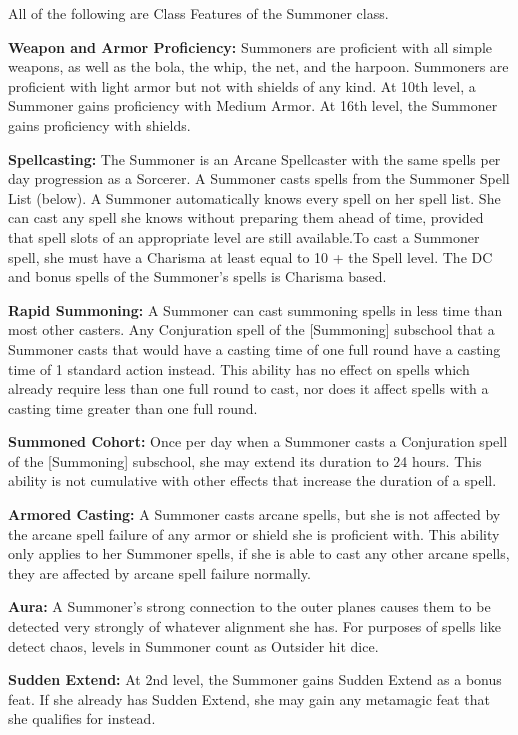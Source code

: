 \documentclass[10pt]{article}
\newcommand{\ability}[2]{\smallskip \noindent \textbf{#1} #2}
\begin{document}
\noindent All of the following are Class Features of the Summoner class.

\ability{Weapon and Armor Proficiency:}{Summoners are proficient with all simple weapons, as well as the bola, the whip, the net, and the harpoon. Summoners are proficient with light armor but not with shields of any kind. At 10th level, a Summoner gains proficiency with Medium Armor. At 16th level, the Summoner gains proficiency with shields.}

\ability{Spellcasting:}{The Summoner is an Arcane Spellcaster with the same spells per day progression as a Sorcerer. A Summoner casts spells from the Summoner Spell List (below). A Summoner automatically knows every spell on her spell list. She can cast any spell she knows without preparing them ahead of time, provided that spell slots of an appropriate level are still available.To cast a Summoner spell, she must have a Charisma at least equal to 10 + the Spell level. The DC and bonus spells of the Summoner's spells is Charisma based.}

\ability{Rapid Summoning:}{A Summoner can cast summoning spells in less time than most other casters. Any Conjuration spell of the [Summoning] subschool that a Summoner casts that would have a casting time of one full round have a casting time of 1 standard action instead. This ability has no effect on spells which already require less than one full round to cast, nor does it affect spells with a casting time greater than one full round.}

\ability{Summoned Cohort:}{Once per day when a Summoner casts a Conjuration spell of the [Summoning] subschool, she may extend its duration to 24 hours. This ability is not cumulative with other effects that increase the duration of a spell.}

\ability{Armored Casting:}{A Summoner casts arcane spells, but she is not affected by the arcane spell failure of any armor or shield she is proficient with. This ability only applies to her Summoner spells, if she is able to cast any other arcane spells, they are affected by arcane spell failure normally.}

\ability{Aura:}{A Summoner's strong connection to the outer planes causes them to be detected very strongly of whatever alignment she has. For purposes of spells like detect chaos, levels in Summoner count as Outsider hit dice.}

\ability{Sudden Extend:}{At 2nd level, the Summoner gains Sudden Extend as a bonus feat. If she already has Sudden Extend, she may gain any metamagic feat that she qualifies for instead.}
\end{document}
